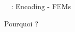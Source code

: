 \begin{frame}{\appendixname~\insertframenumber~: Encoding - FEMs}\label{frame:encoding_fems}
	
	Pourquoi ?
\end{frame}

%
%
